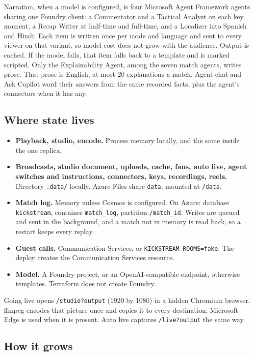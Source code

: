 \documentclass[11pt]{article}
\begin{document}
Narration, when a model is configured, is four Microsoft Agent Framework agents
sharing one Foundry client:
a Commentator and a Tactical Analyst on each key moment, a Recap Writer at
half-time and full-time, and a Localizer into Spanish and Hindi.
Each item is written once per mode and language and sent to every viewer on that
variant, so model cost does not grow with the audience.
Output is cached. If the model fails, that item falls back to a template and is marked scripted.
Only the Explainability Agent, among the seven match agents, writes prose.
That prose is English, at most 20 explanations a match.
Agent chat and Ask Copilot word their answers from the same recorded facts, plus
the agent's connectors when it has any.

\subsection{Where state lives}

\begin{itemize}
  \item \textbf{Playback, studio, encode.} Process memory locally, and the same inside the one replica.
  \item \textbf{Broadcasts, studio document, uploads, cache, fans, auto live, agent switches and instructions, connectors, keys, recordings, reels.} Directory \texttt{.data/} locally. Azure Files share \texttt{data}, mounted at \texttt{/data}.
  \item \textbf{Match log.} Memory unless Cosmos is configured. On Azure: database \texttt{kickstream}, container \texttt{match\_log}, partition \texttt{/match\_id}. Writes are queued and sent in the background, and a match not in memory is read back, so a restart keeps every replay.
  \item \textbf{Guest calls.} Communication Services, or \texttt{KICKSTREAM\_ROOMS=fake}. The deploy creates the Communication Services resource.
  \item \textbf{Model.} A Foundry project, or an OpenAI-compatible endpoint, otherwise templates. Terraform does not create Foundry.
\end{itemize}

Going live opens \texttt{/studio?output} (1920 by 1080) in a hidden Chromium browser.
ffmpeg encodes that picture once and copies it to every destination.
Microsoft Edge is used when it is present.
Auto live captures \texttt{/live?output} the same way.

\subsection{How it grows}
\end{document}
